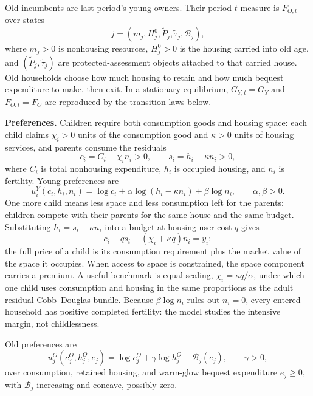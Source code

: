 \documentclass[11pt]{article}
\newcommand{\1}{\mathbf 1}
\begin{document}
Old incumbents are last period's young owners. Their period-$t$ measure is $F_{O,t}$ over states
\[
j=(m_j,H_j^0,\tilde P_j,\tilde\tau_j,\mathcal B_j),
\]
where $m_j>0$ is nonhousing resources, $H_j^0>0$ is the housing carried into old age, and $(\tilde P_j,\tilde\tau_j)$ are protected-assessment objects attached to that carried house. Old households choose how much housing to retain and how much bequest expenditure to make, then exit. In a stationary equilibrium, $G_{Y,t}=G_Y$ and $F_{O,t}=F_O$ are reproduced by the transition laws below.

\textbf{Preferences.} Children require both consumption goods and housing space: each child claims $\chi_i>0$ units of the consumption good and $\kappa>0$ units of housing services, and parents consume the residuals
\[
c_i=C_i-\chi_i n_i>0,
\qquad
s_i=h_i-\kappa n_i>0,
\]
where $C_i$ is total nonhousing expenditure, $h_i$ is occupied housing, and $n_i$ is fertility. Young preferences are
\[
u_i^Y(c_i,h_i,n_i)=
\log c_i+\alpha\log(h_i-\kappa n_i)+\beta\log n_i,
\qquad \alpha,\beta>0.
\]
One more child means less space and less consumption left for the parents: children compete with their parents for the same house and the same budget. Substituting $h_i=s_i+\kappa n_i$ into a budget at housing user cost $q$ gives
\[
c_i+q s_i+\left(\chi_i+\kappa q\right)n_i=y_i:
\]
the full price of a child is its consumption requirement plus the market value of the space it occupies. When access to space is constrained, the space component carries a premium. A useful benchmark is equal scaling, $\chi_i=\kappa q/\alpha$, under which one child uses consumption and housing in the same proportions as the adult residual Cobb--Douglas bundle. Because $\beta\log n_i$ rules out $n_i=0$, every entered household has positive completed fertility: the model studies the intensive margin, not childlessness.

Old preferences are
\[
u_j^O(c_j^O,h_j^O,e_j)
=
\log c_j^O+\gamma\log h_j^O+\mathcal B_j(e_j),
\qquad
\gamma>0,
\]
over consumption, retained housing, and warm-glow bequest expenditure $e_j\ge0$, with $\mathcal B_j$ increasing and concave, possibly zero.
\end{document}
